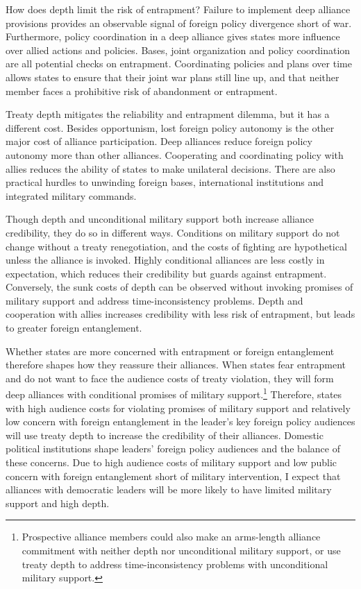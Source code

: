 \documentclass[12pt]{article}
\begin{document}
How does depth limit the risk of entrapment?   
Failure to implement deep alliance provisions provides an observable signal of foreign policy divergence short of war.
Furthermore, policy coordination in a deep alliance gives states more influence over allied actions and policies. 
Bases, joint organization and policy coordination are all potential checks on entrapment.
Coordinating policies and plans over time allows states to ensure that their joint war plans still line up, and that neither member faces a prohibitive risk of abandonment or entrapment.  


Treaty depth mitigates the reliability and entrapment dilemma, but it has a different cost. 
Besides opportunism, lost foreign policy autonomy is the other major cost of alliance participation. 
Deep alliances reduce foreign policy autonomy more than other alliances.
Cooperating and coordinating policy with allies reduces the ability of states to make unilateral decisions. 
There are also practical hurdles to unwinding foreign bases, international institutions and integrated military commands. 


Though depth and unconditional military support both increase alliance credibility, they do so in different ways. 
Conditions on military support do not change without a treaty renegotiation, and the costs of fighting are hypothetical unless the alliance is invoked.  
Highly conditional alliances are less costly in expectation, which reduces their credibility but guards against entrapment. 
Conversely, the sunk costs of depth can be observed without invoking promises of military support and address time-inconsistency problems.
Depth and cooperation with allies increases credibility with less risk of entrapment, but leads to greater foreign entanglement.   


Whether states are more concerned with entrapment or foreign entanglement therefore shapes how they reassure their alliances. 
When states fear entrapment and do not want to face the audience costs of treaty violation, they will form deep alliances with conditional promises of military support.\footnote{Prospective alliance members could also make an arms-length alliance commitment with neither depth nor unconditional military support, or use treaty depth to address time-inconsistency problems with unconditional military support.}
Therefore, states with high audience costs for violating promises of military support and relatively low concern with foreign entanglement in the leader's key foreign policy audiences will use treaty depth to increase the credibility of their alliances. 
Domestic political institutions shape leaders' foreign policy audiences and the balance of these concerns.  
Due to high audience costs of military support and low public concern with foreign entanglement short of military intervention, I expect that alliances with democratic leaders will be more likely to have limited military support and high depth. 
\end{document}
